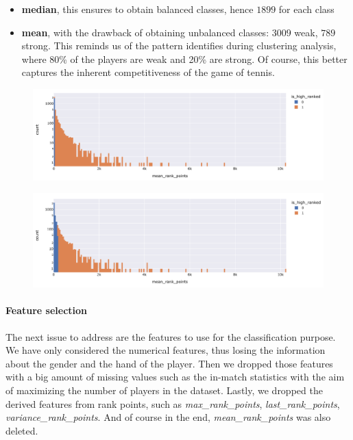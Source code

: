 \begin{itemize}
    \item \textbf{median}, this ensures to obtain balanced classes, hence $1899$ for each class
    \item \textbf{mean}, with the drawback of obtaining unbalanced classes: $3009$ weak, $789$ strong. This reminds us of the pattern identifies during clustering analysis, where 80\% of the players are weak and 20\% are strong. Of course, this better captures the inherent competitiveness of the game of tennis.
\end{itemize}

\begin{figure}[h]
	\centering
	\begin{minipage}{.5\textwidth}
		\centering
		\includegraphics[width=\textwidth]{plots/median_splitting.png}
		\label{fig:median_splitting}
	\end{minipage}%
	\begin{minipage}{.5\textwidth}
		\centering
		\includegraphics[width=\textwidth]{plots/mean_splitting.png}
		\label{fig:mean_splitting}
	\end{minipage}
\end{figure}

\paragraph{Feature selection}
The next issue to address are the features to use for the classification purpose. We have only considered the numerical features, thus losing the information about the gender and the hand of the player. Then we dropped those features with a big amount of missing values such as the in-match statistics with the aim of maximizing the number of players in the dataset. Lastly, we dropped the derived features from rank points, such as \textit{max\_rank\_points}, \textit{last\_rank\_points}, \textit{variance\_rank\_points}. And of course in the end, \textit{mean\_rank\_points} was also deleted.

